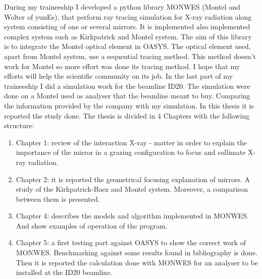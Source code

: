 \newline
During my traineeship I developed a python library MONWES (Montel and Wolter of yunEs), that perform ray tracing simulation for X-ray radiation along system consisting of one or several mirrors. It is implemented also implemented complex system such as Kirkpatrick and Montel system. The aim of this library is   to integrate the Montel optical element in OASYS. The optical element used, apart from Montel system, use a sequential tracing method. This method doesn't work for Montel so more effort was done its tracing method. I hope that my efforts will help the scientific community on its job.
\newline
In the last part of my traineeship I did a simulation work for the beamline ID20. The simulation were done on a Montel used as analyser that the beamline meant to buy. Comparing the information provided by the company with my simulation. In this thesis it is reported the study done.
\newline
The thesis is divided in 4 Chapters with the following structure:
\begin{enumerate}
\item Chapter 1: review of the interaction X-ray - matter in order to explain the importance of the mirror in a grazing configuration to focus and collimate X-ray radiation.
\item Chapter 2: it is reported the geometrical focusing explanation of mirrors. A study of the Kirkpatrick-Baez and Montel system. Moreover, a comparison between them is presented.
\item Chapter 4: describes the models and algorithm implemented in MONWES. And show examples of operation of the program.
\item Chapter 5: a first testing part against OASYS to show the correct work of MONWES. Benchmarking against some results found in bibliography is done. Then it is reported the calculation done with MONWES for an analyser to be installed at the ID20 beamline. 
\end{enumerate}